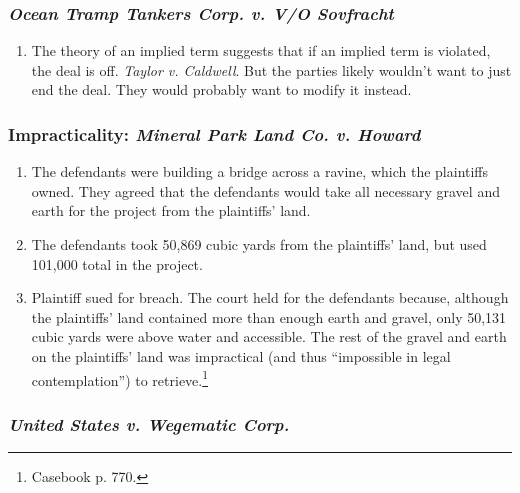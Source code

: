 \subsubsection{\emph{Ocean Tramp Tankers Corp. v. V/O Sovfracht}}

\begin{enumerate}
    \item The theory of an implied term suggests that if an implied term is 
    violated, the deal is off. \emph{Taylor v. Caldwell}. But the parties 
    likely wouldn't want to just end the deal. They would probably want to 
    modify it instead.
\end{enumerate}

\subsubsection{Impracticality: \emph{Mineral Park Land Co. v. Howard}}

\begin{enumerate}
    \item The defendants were building a bridge across a ravine, which the 
    plaintiffs owned. They agreed that the defendants would take all necessary 
    gravel and earth for the project from the plaintiffs' land.
    \item The defendants took 50,869 cubic yards from the plaintiffs' land, 
    but used 101,000 total in the project.
    \item Plaintiff sued for breach. The court held for the defendants 
    because, although the plaintiffs' land contained more than enough earth 
    and gravel, only 50,131 cubic yards were above water and accessible. The 
    rest of the gravel and earth on the plaintiffs' land was impractical (and 
    thus ``impossible in legal contemplation'') to retrieve.\footnote{Casebook 
    p. 770.}
\end{enumerate}

\subsubsection{\emph{United States v. Wegematic Corp.}}

